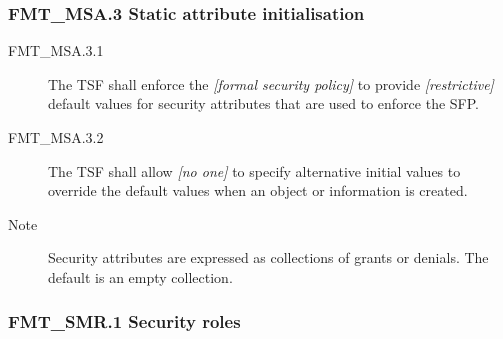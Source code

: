 \documentclass[10pt,a4paper,english]{article}
\begin{document}
\subsubsection*{FMT{\_}MSA.3 Static attribute initialisation}
\begin{description}
\item[FMT{\_}MSA.3.1]

The TSF shall enforce the \emph{{[}formal security policy]} to provide 
\emph{{[}restrictive]} default values for security attributes that are used to 
enforce the SFP.

\item[FMT{\_}MSA.3.2 ]

The TSF shall allow \emph{{[}no one]} to specify alternative
initial values to override the default values when an object or
information is created.

\item[Note]

Security attributes are expressed as collections of grants or
denials. The default is an empty collection.

\end{description}



\hypertarget{fmt-smr-1-security-roles}{}
\subsubsection*{FMT{\_}SMR.1 Security roles}
\end{document}

